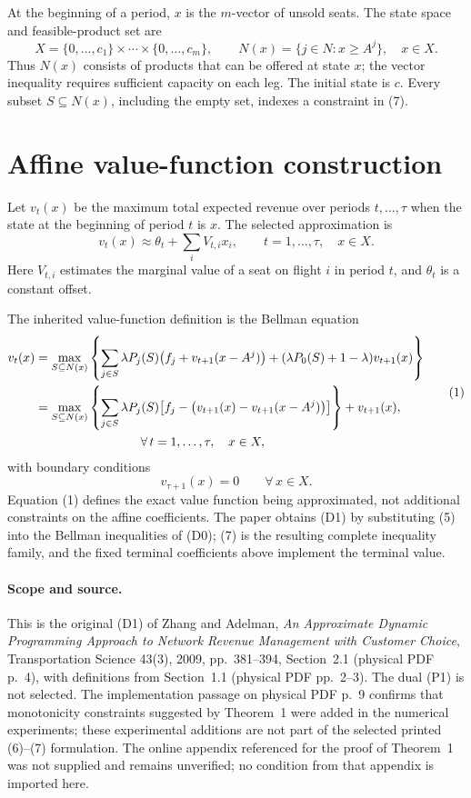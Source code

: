 \documentclass{article}
\begin{document}
At the beginning of a period, $x$ is the $m$-vector of unsold seats. The state space and feasible-product set are
\[
X=\{0,\ldots,c_1\}\times\cdots\times\{0,\ldots,c_m\},
\qquad
N(x)=\{j\in N:x\geq A^j\},\quad x\in X.
\]
Thus $N(x)$ consists of products that can be offered at state $x$; the vector inequality requires sufficient capacity on each leg. The initial state is $c$. Every subset $S\subseteq N(x)$, including the empty set, indexes a constraint in (7).

\section*{Affine value-function construction}

Let $v_t(x)$ be the maximum total expected revenue over periods $t,\ldots,\tau$ when the state at the beginning of period $t$ is $x$. The selected approximation is
\begin{equation}
v_t(x)\approx\theta_t+\sum_i V_{t,i}x_i,
\qquad t=1,\ldots,\tau,\quad x\in X.
\tag{5}
\end{equation}
Here $V_{t,i}$ estimates the marginal value of a seat on flight $i$ in period $t$, and $\theta_t$ is a constant offset.

The inherited value-function definition is the Bellman equation
\begin{equation}
\begin{aligned}
v_t(x)
&=\max_{S\subseteq N(x)}\left\{
\sum_{j\in S}\lambda P_j(S)\bigl(f_j+v_{t+1}(x-A^j)\bigr)
 +(\lambda P_0(S)+1-\lambda)v_{t+1}(x)
\right\}\\
&=\max_{S\subseteq N(x)}\left\{
\sum_{j\in S}\lambda P_j(S)
\bigl[f_j-\bigl(v_{t+1}(x)-v_{t+1}(x-A^j)\bigr)\bigr]
\right\}+v_{t+1}(x),\\
&\hspace{30mm}\forall\,t=1,\ldots,\tau,\quad x\in X,
\end{aligned}
\tag{1}
\end{equation}
with boundary conditions
\[
v_{\tau+1}(x)=0\qquad\forall\,x\in X.
\]
Equation (1) defines the exact value function being approximated, not additional constraints on the affine coefficients. The paper obtains (D1) by substituting (5) into the Bellman inequalities of (D0); (7) is the resulting complete inequality family, and the fixed terminal coefficients above implement the terminal value.

\paragraph{Scope and source.}
This is the original (D1) of Zhang and Adelman, \emph{An Approximate Dynamic Programming Approach to Network Revenue Management with Customer Choice}, Transportation Science 43(3), 2009, pp.~381--394, Section~2.1 (physical PDF p.~4), with definitions from Section~1.1 (physical PDF pp.~2--3). The dual (P1) is not selected. The implementation passage on physical PDF p.~9 confirms that monotonicity constraints suggested by Theorem~1 were added in the numerical experiments; these experimental additions are not part of the selected printed (6)--(7) formulation. The online appendix referenced for the proof of Theorem~1 was not supplied and remains unverified; no condition from that appendix is imported here.
\end{document}
